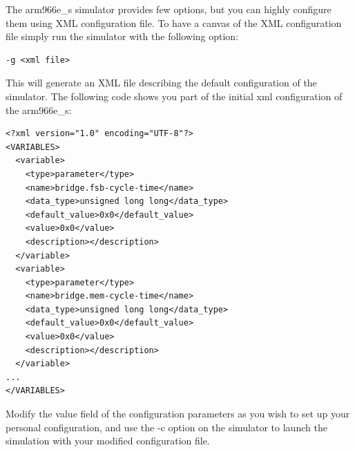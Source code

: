 The arm966e\_s simulator provides few options, but you can highly configure them using XML configuration file. To have a canvas of the XML configuration file simply run the simulator with the following option:
\begin{verbatim}
-g <xml file>
\end{verbatim}

This will generate an XML file describing the default configuration of the simulator. The following code shows you part of the initial xml configuration of the arm966e\_s:
\begin{verbatim}
<?xml version="1.0" encoding="UTF-8"?>
<VARIABLES>
  <variable>
    <type>parameter</type>
    <name>bridge.fsb-cycle-time</name>
    <data_type>unsigned long long</data_type>
    <default_value>0x0</default_value>
    <value>0x0</value>
    <description></description>
  </variable>
  <variable>
    <type>parameter</type>
    <name>bridge.mem-cycle-time</name>
    <data_type>unsigned long long</data_type>
    <default_value>0x0</default_value>
    <value>0x0</value>
    <description></description>
  </variable>
...
</VARIABLES>
\end{verbatim}

Modify the value field of the configuration parameters as you wish to set up your personal configuration, and use the -c option on the simulator to launch the simulation with your modified configuration file.
